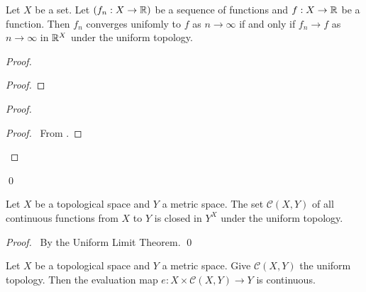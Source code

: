 \begin{proposition}
    Let $X$ be a set. Let $(f_n : X \rightarrow \mathbb{R})$ be a sequence of functions and $f : X \rightarrow \mathbb{R}$ be a function.
    Then $f_n$ converges unifomly to $f$ as $n \rightarrow \infty$ if and only if $f_n \rightarrow f$ as $n \rightarrow \infty$
    in $\mathbb{R}^X$ under the uniform topology.
\end{proposition}

\begin{proof}
    \pf
    \begin{proof}
    \end{proof}
    \begin{proof}
        \begin{proof}
            \pf\ From .
        \end{proof}
    \end{proof}
    \qed
\end{proof}

\begin{corollary}
    Let $X$ be a topological space and $Y$ a metric space. The set $\mathcal{C}(X,Y)$ of all continuous functions from $X$ to $Y$
    is closed in $Y^X$ under the uniform topology.
\end{corollary}

\begin{proof}
    \pf\ By the Uniform Limit Theorem. \qed
\end{proof}

\begin{proposition}
    \label{proposition:evaluation_continuous}
    Let $X$ be a topological space and $Y$ a metric space. Give $\mathcal{C}(X,Y)$ the uniform topology. Then the evaluation map
    $e : X \times \mathcal{C}(X,Y) \rightarrow Y$ is continuous.
\end{proposition}

